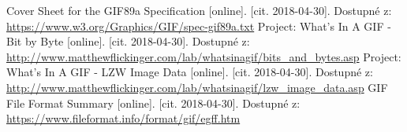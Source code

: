 \documentclass[a4paper,12pt,times]{article}
\begin{document}
\clearpage
\thispagestyle{empty}

\renewcommand{\refname}{Zdroje}
\begin{thebibliography}{9}

	Cover Sheet for the GIF89a Specification [online]. [cit. 2018-04-30]. Dostupné z: \url{https://www.w3.org/Graphics/GIF/spec-gif89a.txt}
	Project: What's In A GIF - Bit by Byte [online]. [cit. 2018-04-30]. Dostupné z: \url{http://www.matthewflickinger.com/lab/whatsinagif/bits_and_bytes.asp}
	Project: What's In A GIF - LZW Image Data [online]. [cit. 2018-04-30]. Dostupné z: \url{http://www.matthewflickinger.com/lab/whatsinagif/lzw_image_data.asp}
	GIF File Format Summary [online]. [cit. 2018-04-30]. Dostupné z: \url{https://www.fileformat.info/format/gif/egff.htm}

\end{thebibliography}
\end{document}
